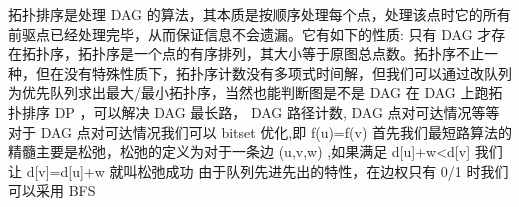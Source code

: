 {}\markdownRendererInterblockSeparator
{}
\markdownRendererSectionEnd 
\markdownRendererSectionEnd \markdownRendererSectionBegin
{}\markdownRendererInterblockSeparator
{}拓扑排序是处理\markdownRendererDollarSign{} DAG \markdownRendererDollarSign{}的算法，其本质是按顺序处理每个点，处理该点时它的所有前驱点已经处理完毕，从而保证信息不会遗漏。它有如下的性质:\markdownRendererParagraphSeparator
{}只有\markdownRendererDollarSign{} DAG \markdownRendererDollarSign{}才存在拓扑序，拓扑序是一个点的有序排列，其大小等于原图总点数。拓扑序不止一种，但在没有特殊性质下，拓扑序计数没有多项式时间解，但我们可以通过改队列为优先队列求出最大/最小拓扑序，当然也能判断图是不是\markdownRendererDollarSign{} DAG \markdownRendererDollarSign{}\markdownRendererParagraphSeparator
{}在\markdownRendererDollarSign{} DAG \markdownRendererDollarSign{}上跑拓扑排序\markdownRendererDollarSign{} DP\markdownRendererSoftLineBreak
{}\markdownRendererDollarSign{}，可以解决\markdownRendererDollarSign{} DAG \markdownRendererDollarSign{}最长路，\markdownRendererDollarSign{} DAG \markdownRendererDollarSign{}路径计数,\markdownRendererDollarSign{} DAG\markdownRendererParagraphSeparator
{} \markdownRendererDollarSign{}点对可达情况等等\markdownRendererParagraphSeparator
{}对于\markdownRendererDollarSign{} DAG \markdownRendererDollarSign{}点对可达情况我们可以\markdownRendererDollarSign{} bitset\markdownRendererSoftLineBreak
{}\markdownRendererDollarSign{}优化,即\markdownRendererDollarSign{} f(u)\markdownRendererPipe{}=f(v) \markdownRendererDollarSign{}\markdownRendererInterblockSeparator
{}\markdownRendererInterblockSeparator
{}
\markdownRendererSectionEnd \markdownRendererSectionBegin
{}\markdownRendererInterblockSeparator
{}\markdownRendererSectionBegin
{}\markdownRendererInterblockSeparator
{}首先我们最短路算法的精髓主要是松弛，松弛的定义为对于一条边\markdownRendererDollarSign{} (u,v,w) \markdownRendererDollarSign{},如果满足\markdownRendererDollarSign{} d[u]+w<d[v] \markdownRendererDollarSign{}\markdownRendererParagraphSeparator
{}我们让\markdownRendererDollarSign{} d[v]=d[u]+w \markdownRendererDollarSign{}就叫松弛成功\markdownRendererInterblockSeparator
{}\markdownRendererSectionBegin
{}\markdownRendererInterblockSeparator
{}由于队列先进先出的特性，在边权只有\markdownRendererDollarSign{} 0/1 \markdownRendererDollarSign{}时我们可以采用\markdownRendererDollarSign{} BFS\markdownRendererSoftLineBreak
